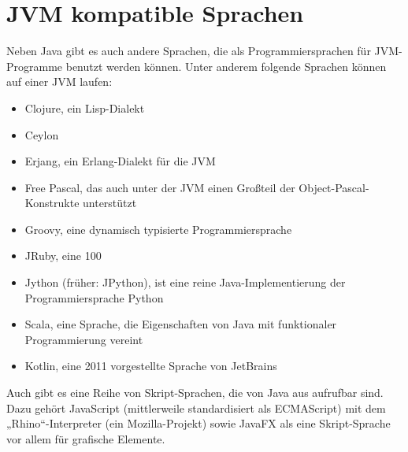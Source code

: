 \documentclass[a4paper,14pt]{scrreprt}
\begin{document}
\section{JVM kompatible Sprachen}
Neben Java gibt es auch andere Sprachen, die als Programmiersprachen für JVM-Programme benutzt werden können. Unter anderem folgende Sprachen können auf einer JVM laufen:
\begin{itemize}
\item Clojure, ein Lisp-Dialekt
\item Ceylon
\item Erjang, ein Erlang-Dialekt für die JVM
\item Free Pascal, das auch unter der JVM einen Großteil der Object-Pascal-Konstrukte unterstützt
\item Groovy, eine dynamisch typisierte Programmiersprache
\item JRuby, eine 100 %
\item Jython (früher: JPython), ist eine reine Java-Implementierung der Programmiersprache Python
\item Scala, eine Sprache, die Eigenschaften von Java mit funktionaler Programmierung vereint
\item Kotlin, eine 2011 vorgestellte Sprache von JetBrains
\end{itemize}
Auch gibt es eine Reihe von Skript-Sprachen, die von Java aus aufrufbar sind. Dazu gehört JavaScript (mittlerweile standardisiert als ECMAScript) mit dem „Rhino“-Interpreter (ein Mozilla-Projekt) sowie JavaFX als eine Skript-Sprache vor allem für grafische Elemente.\cite{jvmEin}\cite{jvmEin1}

\end{document}
